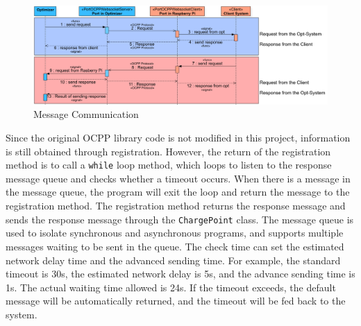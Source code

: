 \documentclass[
	english,
	ruledheaders=section,%
	class=report,%
	thesis={type=Report},%
	accentcolor=9c,%
	custommargins=true,%
	marginpar=false,%
	parskip=half-,%
	fontsize=11pt,%
	logofile={img/tuda_logo.pdf}, %
]{tudapub}
\begin{document}
\begin{figure}[H]
    \centering
    \includegraphics[width=1\linewidth]{img/SignalMsgCommuication.png}
    \caption{Message Communication}
    \label{fig:signalMsgCommunication}
\end{figure}



Since the original \ac{OCPP} library code is not modified in this project, information is still obtained through registration. However, the return of the registration method is to call a \texttt{while} loop method, which loops to listen to the response message queue and checks whether a timeout occurs. When there is a message in the message queue, the program will exit the loop and return the message to the registration method. The registration method returns the response message and sends the response message through the \texttt{ChargePoint} class. The message queue is used to isolate synchronous and asynchronous programs, and supports multiple messages waiting to be sent in the queue. The check time can set the estimated network delay time and the advanced sending time. For example, the standard timeout is 30s, the estimated network delay is 5s, and the advance sending time is 1s. The actual waiting time allowed is 24s. If the timeout exceeds, the default message will be automatically returned, and the timeout will be fed back to the system.
\end{document}
